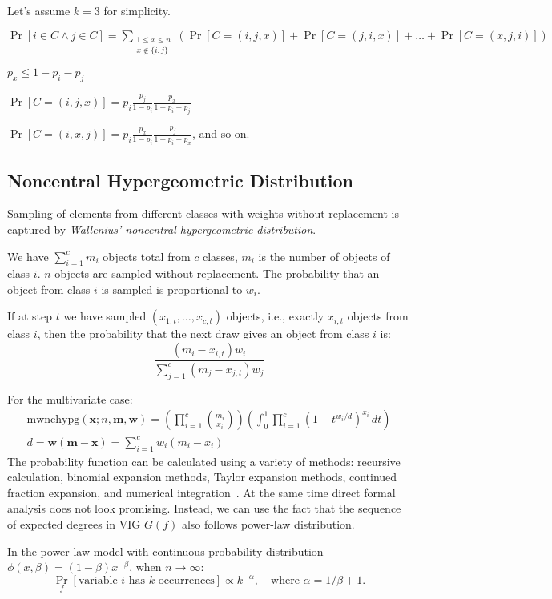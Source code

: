 Let's assume $k=3$ for simplicity.

$\Pr[i\in C\land j\in C]=\sum_{\substack{1\leq x\leq n\\x\notin\{i,j\}}}\left(
    \Pr[C=(i,j,x)]+\Pr[C=(j,i,x)]+\ldots+\Pr[C=(x,j,i)]
\right)$

$p_x\leq1-p_i-p_j$

$\Pr[C=(i,j,x)]=p_i\frac{p_j}{1-p_i}\frac{p_x}{1-p_i-p_j}$

$\Pr[C=(i,x,j)]=p_i\frac{p_x}{1-p_i}\frac{p_j}{1-p_i-p_x}$, and so on.

\subsection{Noncentral Hypergeometric Distribution}
Sampling of elements from different classes with weights without replacement
is captured by \textit{Wallenius' noncentral hypergeometric distribution}.

We have $\sum_{i=1}^c{m_i}$ objects total from $c$ classes,
$m_i$ is the number of objects of class $i$.
$n$ objects are sampled without replacement.
The probability that an object from class $i$ is sampled is proportional to $w_i$.

If at step $t$ we have sampled $(x_{1,t},\ldots,x_{c,t})$ objects,
i.e., exactly $x_{i,t}$ objects from class $i$,
then the probability that the next draw gives an object from class $i$ is:
\begin{equation}
    \frac{(m_i-x_{i,t})w_i}{\sum_{j=1}^c{(m_j-x_{j,t})w_j}}
\end{equation}

For the multivariate case:
\begin{gather}
    \text{mwnchypg}(\mathbf{x};n,\mathbf{m},\mathbf{w})=
    \left(\prod_{i=1}^c{\binom{m_i}{x_i}}\right)
    \left(\int_0^1{\prod_{i=1}^c{(1-t^{w_i/d})^{x_i}}\,dt}\right)\\
    d=\mathbf{w}(\mathbf{m}-\mathbf{x})=\sum_{i=1}^c{w_i(m_i-x_i)}
\end{gather}
The probability function can be calculated using a variety of methods:
recursive calculation, binomial expansion methods,
Taylor expansion methods, continued fraction expansion,
and numerical integration~\cite{fog08}.
At the same time direct formal analysis does not look promising.
Instead, we can use the fact that the sequence of expected degrees
in VIG $G(f)$ also follows power-law distribution.

\begin{theorem}
    In the power-law model with continuous probability distribution
    $\phi(x,\beta)=(1-\beta)x^{-\beta}$, when $n\to\infty$:
    \begin{equation}
        \Pr_f[\text{variable }i\text{ has }k\text{ occurrences}]\propto k^{-\alpha},
        \quad\text{where }\alpha=1/\beta+1.
    \end{equation}
\end{theorem}

